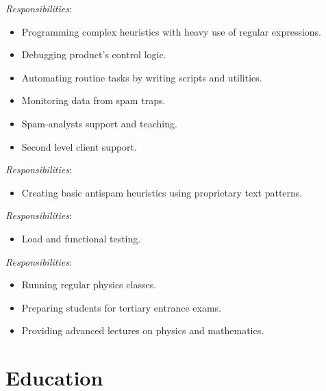 \documentclass[11pt,a4paper,sans]{moderncv}        %
\newcommand{\responsibilities}[1]{ \emph{Responsibilities}:\begin{itemize} #1\end{itemize}}
\begin{document}
\pagebreak
{} {
    \responsibilities {
        \item Programming complex heuristics with heavy use of regular expressions.
        \item Debugging product's control logic.
        \item Automating routine tasks by writing scripts and utilities.
        \item Monitoring data from spam traps.
        \item Spam-analysts support and teaching.
        \item Second level client support.
    }
}

 {
    \responsibilities {
        \item Creating basic antispam heuristics using proprietary text patterns.
    }
}


 {
    \responsibilities {
        \item Load and functional testing.
    }
}

 {
    \responsibilities {
        \item Running regular physics classes.
        \item Preparing students for tertiary entrance exams.
        \item Providing advanced lectures on physics and mathematics.
    }
}


\section{Education}


\end{document}
